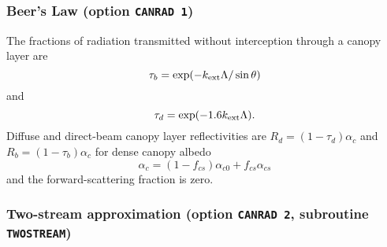 \documentclass[fleqn]{article}
\begin{document}
\subsubsection{Beer's Law (option {\tt CANRAD 1})}

The fractions of radiation transmitted without interception through a canopy layer are
\begin{equation}
\tau_b = \exp(-k_{\rm ext}\Lambda/\sin\theta)
\end{equation}
and
\begin{equation}
\tau_d = \exp(-1.6k_{\rm ext}\Lambda).
\end{equation}
Diffuse and direct-beam canopy layer reflectivities are $R_d = (1-\tau_d)\alpha_c$ and $R_b = (1-\tau_b)\alpha_c$ for dense canopy albedo
\begin{equation}
\alpha_c = (1 - f_{cs})\alpha_{c0} + f_{cs}\alpha_{cs}
\end{equation}
and the forward-scattering fraction is zero.

\subsubsection{Two-stream approximation (option {\tt CANRAD 2}, subroutine {\tt TWOSTREAM})}
\end{document}
